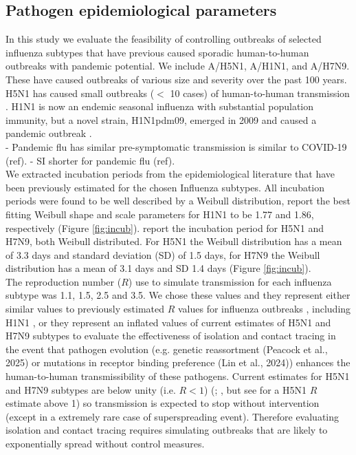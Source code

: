 \documentclass{article}
\begin{document}
\subsection*{Pathogen epidemiological parameters} \label{epiparameters}

In this study we evaluate the feasibility of controlling outbreaks of selected influenza subtypes that have previous caused sporadic human-to-human outbreaks with pandemic potential. We include A/H5N1, A/H1N1, and A/H7N9. These have caused outbreaks of various size and severity over the past 100 years. H5N1 has caused small outbreaks ($<$ 10 cases) of human-to-human transmission \citep{yangDetectingHumanhumanTransmission2007a, aditamaAvianInfluenzaH5N12012a}. H1N1 is now an endemic seasonal influenza with substantial population immunity, but a novel strain, H1N1pdm09, emerged in 2009 and caused a pandemic outbreak \citep{fraserPandemicPotentialStrain2009, lesslerOutbreak2009Pandemic2009}. \\

- Pandemic flu has similar pre-symptomatic transmission is similar to COVID-19 (ref).
- SI shorter for pandemic flu (ref). \\

We extracted incubation periods from the epidemiological literature that have been previously estimated for the chosen Influenza subtypes. All incubation periods were found to be well described by a Weibull distribution, \cite{nishiuraEstimationIncubationPeriod2011} report the best fitting Weibull shape and scale parameters for H1N1 to be 1.77 and 1.86, respectively (Figure \ref{fig:incub}). \cite{cowlingComparativeEpidemiologyHuman2013} report the incubation period for H5N1 and H7N9, both Weibull distributed. For H5N1 the Weibull distribution has a mean of 3.3 days and standard deviation (SD) of 1.5 days, for H7N9 the Weibull distribution has a mean of 3.1 days and SD 1.4 days \citep{cowlingComparativeEpidemiologyHuman2013} (Figure \ref{fig:incub}). \\

The reproduction number ($R$) use to simulate transmission for each influenza subtype was 1.1, 1.5, 2.5 and 3.5. We chose these values and they represent either similar values to previously estimated $R$ values for influenza outbreaks \citep{fergusonStrategiesMitigatingInfluenza2006}, including H1N1 \citep{fraserPandemicPotentialStrain2009, lesslerOutbreak2009Pandemic2009}, or they represent an inflated values of current estimates of H5N1 and H7N9 subtypes to evaluate the effectiveness of isolation and contact tracing in the event that pathogen evolution (e.g. genetic reassortment (Peacock et al., 2025) or mutations in receptor binding preference (Lin et al., 2024)) enhances the human-to-human transmissibility of these pathogens. Current estimates for H5N1 and H7N9 subtypes are below unity (i.e. $R < 1$) (\citealt{tannerPandemicPotentialAvian2015}; \citealt{Ward2024.12.11.24318702}, but see \citealt{yangDetectingHumanhumanTransmission2007a} for a H5N1 $R$ estimate above 1) so transmission is expected to stop without intervention (except in a extremely rare case of superspreading event). Therefore evaluating isolation and contact tracing requires simulating outbreaks that are likely to exponentially spread without control measures.
\end{document}
